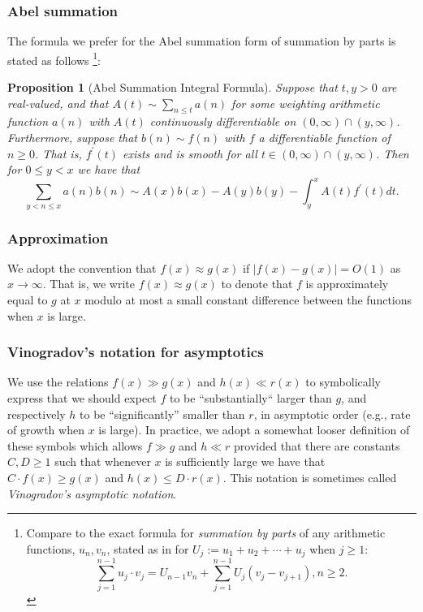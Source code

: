 \documentclass[11pt,reqno,a4letter]{article}
\numberwithin{figure}{section}
\numberwithin{table}{section}
\newcommand{\cf}{\textit{cf.\ }}
\theoremstyle{plain}
\newtheorem{prop}[theorem]{Proposition}
\numberwithin{theorem}{section}
\theoremstyle{definition}
\begin{document}
\subsubsection{Abel summation} 

The formula we prefer for the Abel summation form of summation by parts is stated as follows 
\cite[\cf \S 4.3]{APOSTOLANUMT}\footnote{
     Compare to the exact formula for \emph{summation by parts} of any arithmetic functions, $u_n,v_n$, 
     stated as in \cite[\S 2.10(ii)]{NISTHB} for $U_j := u_1+u_2+\cdots+u_j$ when $j \geq 1$: 
     \[
     \sum_{j=1}^{n-1} u_j \cdot v_j = U_{n-1} v_n + \sum_{j=1}^{n-1} U_j \left(v_j - v_{j+1}\right), n \geq 2. 
     \]
}: 
 
\begin{prop}[Abel Summation Integral Formula] 
\label{prop_AbelSummationFormula} 
Suppose that $t,y > 0$ are real-valued, and that $A(t) \sim \sum_{n \leq t} a(n)$ for some weighting 
arithmetic function $a(n)$ with $A(t)$ continuously differentiable on 
$(0, \infty) \cap (y, \infty)$. Furthermore, suppose that 
$b(n) \sim f(n)$ with $f$ a differentiable function of $n \geq 0$. That is, $f^{\prime}(t)$ exists and is smooth for all 
$t \in (0, \infty) \cap (y, \infty)$. 
Then for $0 \leq y < x$ we have that 
\[
\sum_{y < n \leq x} a(n) b(n) \sim A(x)b(x) - A(y)b(y) - \int_y^{x} A(t) f^{\prime}(t) dt. 
\] 
\end{prop}
          
\subsubsection{Approximation} 
     
We adopt the convention that $f(x) \approx g(x)$ if $|f(x) - g(x)| = O(1)$ as 
$x \rightarrow \infty$. 
That is, we write $f(x) \approx g(x)$ to denote that $f$ is approximately equal to $g$ at $x$ modulo at most a
small constant difference between the functions when $x$ is large. 

\subsubsection{Vinogradov's notation for asymptotics} 

We use the relations $f(x) \gg g(x)$ and $h(x) \ll r(x)$ to symbolically express that we should expect 
$f$ to be ``substantially`` larger than $g$, and respectively $h$ 
to be ``significantly'' smaller than $r$, in asymptotic order 
(e.g., rate of growth when $x$ is large). In practice, we adopt a somewhat looser definition of these symbols which 
allows $f \gg g$ and $h \ll r$ provided that there are constants $C, D \geq 1$ such that whenever $x$ is sufficiently 
large we have that $C \cdot f(x) \geq g(x)$ and $h(x) \leq D \cdot r(x)$. This notation is sometimes called 
\emph{Vinogradov's asymptotic notation}. 
\end{document}
